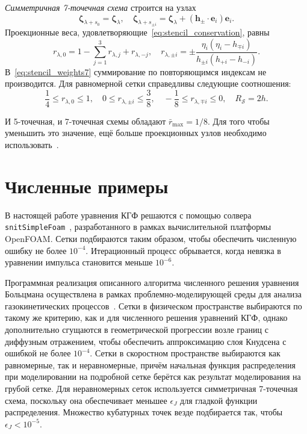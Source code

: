 \documentclass[
aps,%
12pt,%
final,%
notitlepage,%
oneside,%
onecolumn,%
nobibnotes,%
nofootinbib,%
superscriptaddress,%
noshowpacs,%
showkeys,%
floatfix,%
tightenlines,%
centertags]%
{revtex4}
\newcommand{\bzeta}{\boldsymbol{\zeta}}
\newcommand{\bh}{\boldsymbol{h}}
\newcommand{\be}{\boldsymbol{e}}
\begin{document}
\emph{Симметричная 7-точечная схема} строится на узлах
\begin{equation}\label{eq:stencil_nodes7}
    \bzeta_{\lambda+s_0} = \bzeta_{\lambda}, \quad
    \bzeta_{\lambda+s_{\pm i}} = \bzeta_{\lambda} + (\bh_\pm\cdot \be_i)\be_i.
\end{equation}
Проекционные веса, удовлетворяющие~\eqref{eq:stencil_conservation}, равны
\begin{equation}\label{eq:stencil_weights7}
    r_{\lambda,0} = 1 - \sum_{j=1}^3 r_{\lambda,j} + r_{\lambda,-j}, \quad
    r_{\lambda,\pm i} = \pm\frac{\eta_i(\eta_i - h_{\mp i})}{h_{\pm i}(h_{+i}-h_{-i})}.
\end{equation}
В~\eqref{eq:stencil_weights7} суммирование по повторяющимся индексам не производится.
Для равномерной сетки справедливы следующие соотношения:
\begin{equation}\label{eq:weights_ranges7}
    \frac14 \leq r_{\lambda,0} \leq 1, \quad
    0 \leq r_{\lambda,\pm i} \leq \frac38, \quad
    -\frac18 \leq r_{\lambda,\mp i} \leq 0, \quad
    R_\mathcal{S} = 2h.
\end{equation}

И 5-точечная, и 7-точечная схемы обладают \(\bar{r}_{\max}=1/8\).
Для того чтобы уменьшить это значение, ещё больше проекционных узлов необходимо использовать~\citep{Dodulad2012}.

\section{Численные примеры}

В настоящей работе уравнения КГФ решаются с помощью солвера \verb+snitSimpleFoam+~\cite{Rogozin2014},
разработанного в рамках вычислительной платформы OpenFOAM\textregistered{}.
Сетки подбираются таким образом, чтобы обеспечить численную ошибку не более \(10^{-4}\).
Итерационный процесс обрывается, когда невязка в уравнении импульса становится меньше \(10^{-6}\).

Программная реализация описанного алгоритма численного решения уравнения Больцмана
осуществлена в рамках проблемно-моделирующей среды
для анализа газокинетических процессов~\cite{Kloss2011, Kloss2012}.
Сетки в физическом пространстве выбираются по такому же критерию, как и для численного решения уравнений КГФ,
однако дополнительно сгущаются в геометрической прогрессии возле границ с диффузным отражением,
чтобы обеспечить аппроксимацию слоя Кнудсена с ошибкой не более \(10^{-4}\).
Сетки в скоростном пространстве выбираются как равномерные, так и неравномерные,
причём начальная функция распределения при моделировании на подробной сетке берётся
как результат моделирования на грубой сетке.
Для неравномерных сеток используется симметричная 7-точечная схема, поскольку она
обеспечивает меньшее \(\epsilon_J\) для гладкой функции распределения.
Множество кубатурных точек везде подбирается так, чтобы \(\epsilon_J < 10^{-5}\).
\end{document}

